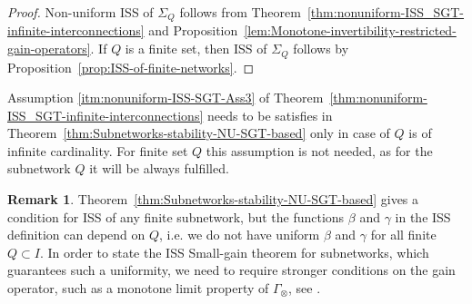 \documentclass[twocolumn]{IEEEtran} %
\theoremstyle{definition}
\newtheorem{remark}[theorem]{Remark}
\newcommand{\mir}[1]{{\color{red}\bf AM: #1}}
\begin{document}
\begin{proof}
Non-uniform ISS of $\Sigma_Q$ follows from Theorem~\ref{thm:nonuniform-ISS_SGT-infinite-interconnections} and Proposition~\ref{lem:Monotone-invertibility-restricted-gain-operators}.
If $Q$ is a finite set, then ISS of $\Sigma_Q$ follows by Proposition~\ref{prop:ISS-of-finite-networks}.
\end{proof}

Assumption \ref{itm:nonuniform-ISS-SGT-Ass3} of Theorem~\ref{thm:nonuniform-ISS_SGT-infinite-interconnections} needs to be satisfies in 
Theorem~\ref{thm:Subnetworks-stability-NU-SGT-based} only in case of $Q$ is of infinite cardinality. For finite set $Q$ this assumption is not needed, as for the subnetwork $Q$ it will be always fulfilled.


\begin{remark}
\label{rem:Uniform-SGT-for-subnetworks} 
Theorem~\ref{thm:Subnetworks-stability-NU-SGT-based} gives a condition for ISS of any finite subnetwork, but the functions $\beta$ and $\gamma$ in the ISS definition can depend on $Q$, i.e. we do not have uniform $\beta$ and $\gamma$ for all finite $Q \subset I$.
In order to state the ISS Small-gain theorem for subnetworks, which guarantees such a uniformity, we need to require stronger conditions on the gain operator, such as a monotone limit property of $\Gamma_\otimes$, see \cite[Theorem 2]{MKG20}. 
\end{remark}






%

%
%
%
\end{document}
